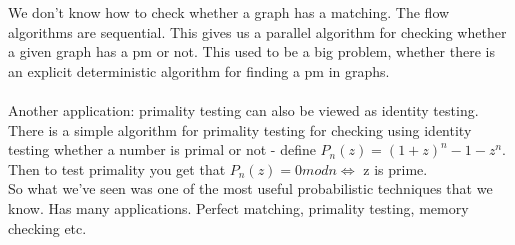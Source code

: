 \documentclass{article}
\begin{document}
We don't know how to check whether a graph has a matching. The flow algorithms are sequential. This gives us a parallel algorithm for checking whether a given graph has a pm or not. This used to be a big problem, whether there is an explicit deterministic algorithm for finding a pm in graphs.\\\\

Another application: primality testing can also be viewed as identity testing. There is a simple algorithm for primality testing for checking using identity testing whether a number is primal or not - define 
$P_n(z)=(1+z)^{n}-1-z^n$. Then to test primality you get that 
$P_n(z)=0 mod n \iff$ z is prime.\\

So what we've seen was one of the most useful probabilistic techniques that we know. Has many applications. Perfect matching, primality testing, memory checking etc. 

 
\end{document}
